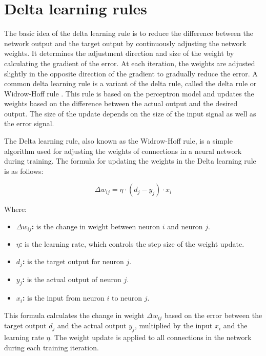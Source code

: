 \documentclass[12pt,a4paper]{report}
\begin{document}
\section{Delta learning rules}

The basic idea of the delta learning rule is to reduce the difference between the network output and the target output by continuously adjusting the network weights. It determines the adjustment direction and size of the weight by calculating the gradient of the error. At each iteration, the weights are adjusted slightly in the opposite direction of the gradient to gradually reduce the error.
A common delta learning rule is a variant of the delta rule, called the delta rule or Widrow-Hoff rule \cite{BernardWidrow1960AdaptiveSwitchingCircuits}. This rule is based on the perceptron model and updates the weights based on the difference between the actual output and the desired output. The size of the update depends on the size of the input signal as well as the error signal.

The Delta learning rule, also known as the Widrow-Hoff rule, is a simple algorithm used for adjusting the weights of connections in a neural network during training. The formula for updating the weights in the Delta learning rule is as follows:

\[ \Delta w_{ij} = \eta \cdot (d_j - y_j) \cdot x_i \]

Where:

\begin{itemize}
    \item \textbf{ $\Delta w_{ij}$:} is the change in weight between neuron \( i \) and neuron \( j \).
    \item \textbf{$\eta $:} is the learning rate, which controls the step size of the weight update.
    \item \textbf{ $d_{j}$:} is the target output for neuron \( j \).
    \item \textbf{$y_j$:} is the actual output of neuron \( j \).
    \item \textbf{$x_i$:} is the input from neuron \( i \) to neuron \( j \).
\end{itemize}

This formula calculates the change in weight \( \Delta w_{ij} \) based on the error between the target output \( d_j \) and the actual output \( y_j \), multiplied by the input \( x_i \) and the learning rate \( \eta \). The weight update is applied to all connections in the network during each training iteration.
\end{document}
